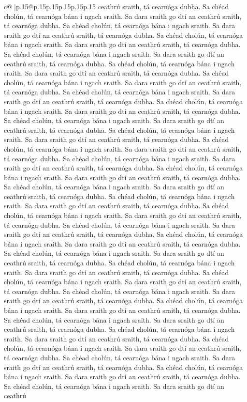 \documentclass{article}
\begin{document}
{\begin{supertabular}{c@{$\;$}|p{.15\linewidth}@{}p{.15\linewidth}p{.15\linewidth}p{.15\linewidth}p{.15\linewidth}p{.15\linewidth}}
{{{ceathrú sraith, tá cearnóga dubha. Sa chéad cholún, tá cearnóga bána i ngach sraith. Sa dara sraith go dtí an ceathrú sraith, tá cearnóga dubha. Sa chéad cholún, tá cearnóga bána i ngach sraith. Sa dara sraith go dtí an ceathrú sraith, tá cearnóga dubha. Sa chéad cholún, tá cearnóga bána i ngach sraith. Sa dara sraith go dtí an ceathrú sraith, tá cearnóga dubha. Sa chéad cholún, tá cearnóga bána i ngach sraith. Sa dara sraith go dtí an ceathrú sraith, tá cearnóga dubha. Sa chéad cholún, tá cearnóga bána i ngach sraith. Sa dara sraith go dtí an ceathrú sraith, tá cearnóga dubha. Sa chéad cholún, tá cearnóga bána i ngach sraith. Sa dara sraith go dtí an ceathrú sraith, tá cearnóga dubha. Sa chéad cholún, tá cearnóga bána i ngach sraith. Sa dara sraith go dtí an ceathrú sraith, tá cearnóga dubha. Sa chéad cholún, tá cearnóga bána i ngach sraith. Sa dara sraith go dtí an ceathrú sraith, tá cearnóga dubha. Sa chéad cholún, tá cearnóga bána i ngach sraith. Sa dara sraith go dtí an ceathrú sraith, tá cearnóga dubha. Sa chéad cholún, tá cearnóga bána i ngach sraith. Sa dara sraith go dtí an ceathrú sraith, tá cearnóga dubha. Sa chéad cholún, tá cearnóga bána i ngach sraith. Sa dara sraith go dtí an ceathrú sraith, tá cearnóga dubha. Sa chéad cholún, tá cearnóga bána i ngach sraith. Sa dara sraith go dtí an ceathrú sraith, tá cearnóga dubha. Sa chéad cholún, tá cearnóga bána i ngach sraith. Sa dara sraith go dtí an ceathrú sraith, tá cearnóga dubha. Sa chéad cholún, tá cearnóga bána i ngach sraith. Sa dara sraith go dtí an ceathrú sraith, tá cearnóga dubha. Sa chéad cholún, tá cearnóga bána i ngach sraith. Sa dara sraith go dtí an ceathrú sraith, tá cearnóga dubha. Sa chéad cholún, tá cearnóga bána i ngach sraith. Sa dara sraith go dtí an ceathrú sraith, tá cearnóga dubha. Sa chéad cholún, tá cearnóga bána i ngach sraith. Sa dara sraith go dtí an ceathrú sraith, tá cearnóga dubha. Sa chéad cholún, tá cearnóga bána i ngach sraith. Sa dara sraith go dtí an ceathrú sraith, tá cearnóga dubha. Sa chéad cholún, tá cearnóga bána i ngach sraith. Sa dara sraith go dtí an ceathrú sraith, tá cearnóga dubha. Sa chéad cholún, tá cearnóga bána i ngach sraith. Sa dara sraith go dtí an ceathrú sraith, tá cearnóga dubha. Sa chéad cholún, tá cearnóga bána i ngach sraith. Sa dara sraith go dtí an ceathrú sraith, tá cearnóga dubha. Sa chéad cholún, tá cearnóga bána i ngach sraith. Sa dara sraith go dtí an ceathrú sraith, tá cearnóga dubha. Sa chéad cholún, tá cearnóga bána i ngach sraith. Sa dara sraith go dtí an ceathrú sraith, tá cearnóga dubha. Sa chéad cholún, tá cearnóga bána i ngach sraith. Sa dara sraith go dtí an ceathrú sraith, tá cearnóga dubha. Sa chéad cholún, tá cearnóga bána i ngach sraith. Sa dara sraith go dtí an ceathrú sraith, tá cearnóga dubha. Sa chéad cholún, tá cearnóga bána i ngach sraith. Sa dara sraith go dtí an ceathrú sraith, tá cearnóga dubha. Sa chéad cholún, tá cearnóga bána i ngach sraith. Sa dara sraith go dtí an ceathrú sraith, tá cearnóga dubha. Sa chéad cholún, tá cearnóga bána i ngach sraith. Sa dara sraith go dtí an ceathrú sraith, tá cearnóga dubha. Sa chéad cholún, tá cearnóga bána i ngach sraith. Sa dara sraith go dtí an ceathrú }}}
\end{supertabular}}
\end{document}
